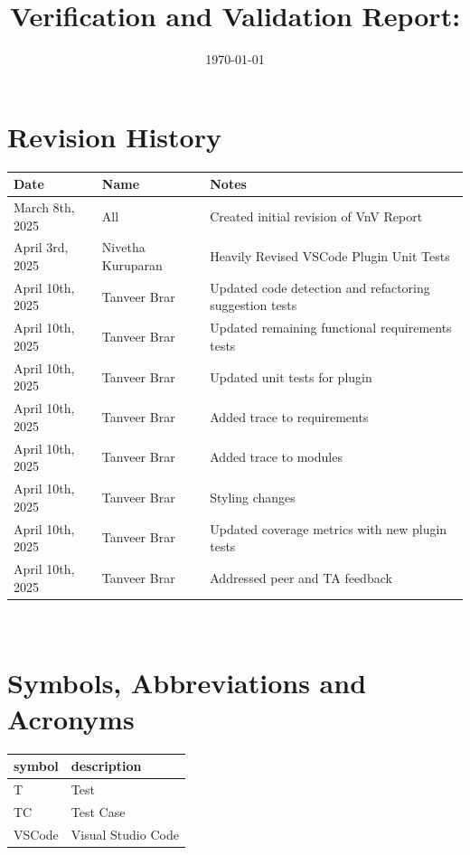 \documentclass[12pt, titlepage]{article}
\begin{document}
\title{Verification and Validation Report: \progname}
\author{\authname}
\date{\today}

\maketitle


\section*{Revision History}

\begin{tabularx}{\textwidth}{p{4cm}p{4cm}X}
  \toprule {\bf Date} & {\bf Name} & {\bf Notes}\\
  \midrule
  March 8th, 2025 & All & Created initial revision of VnV Report\\
  April 3rd, 2025 & Nivetha Kuruparan & Heavily Revised VSCode Plugin Unit Tests\\
  April 10th, 2025 & Tanveer Brar & Updated code detection and refactoring suggestion tests\\
  April 10th, 2025 & Tanveer Brar & Updated remaining functional requirements tests\\
  April 10th, 2025 & Tanveer Brar & Updated unit tests for plugin\\
  April 10th, 2025 & Tanveer Brar & Added trace to requirements\\
  April 10th, 2025 & Tanveer Brar & Added trace to modules\\
  April 10th, 2025 & Tanveer Brar & Styling changes\\
  April 10th, 2025 & Tanveer Brar & Updated coverage metrics with new plugin tests\\
  April 10th, 2025 & Tanveer Brar & Addressed peer and TA feedback\\
  \bottomrule
\end{tabularx}

~\newpage

\section*{Symbols, Abbreviations and Acronyms}

\renewcommand{\arraystretch}{1.2}
\begin{tabular}{l l}
  \toprule
  \textbf{symbol} & \textbf{description}\\
  \midrule
  T & Test\\
  TC & Test Case\\
  VSCode & Visual Studio Code\\
  \bottomrule
\end{tabular}\\
\end{document}
